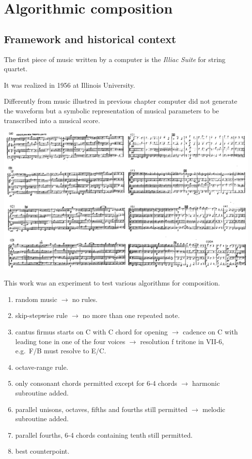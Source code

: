 \chapter{Algorithmic  composition}

\section{Framework and historical context}\label{framework-and-historical-context}

The first piece of music written by a computer is the \textit{Illiac Suite} for string quartet.

It was realized in 1956 at Illinois University.

Differently from music illustred in previous chapter computer did not generate the waveform but a symbolic representation of musical parameters to be transcribed into a musical score.

\begin{center}
\includegraphics[scale=1]{../img/illiac.png}
\end{center}

This work was an experiment to test various algorithms for composition.

\begin{enumerate}
\def\labelenumi{\arabic{enumi}.}
\tightlist
\item random music \(\rightarrow\) no rules.
\item skip-stepwise rule \(\rightarrow\) no more than one repeated note.
\item cantus firmus starts on C with C chord for opening \(\rightarrow\) cadence on C with leading tone in one of the four voices \(\rightarrow\) resolution f tritone in VII-6, e.g.~F/B must resolve to E/C.
\item octave-range rule.
\item only consonant chords permitted except for 6-4 chords \(\rightarrow\) harmonic subroutine added.
\item parallel unisons, octaves, fifths and fourths still permitted \(\rightarrow\) melodic subroutine added.
\item parallel fourths, 6-4 chords containing tenth still permitted.
\item best counterpoint.
\end{enumerate}

